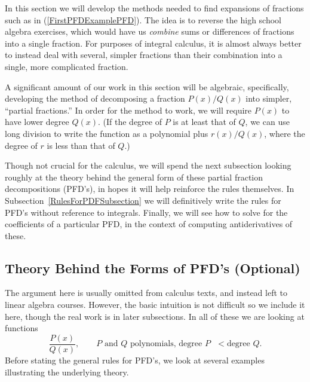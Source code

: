 In this section we will develop the methods needed to 
find expansions of fractions such as 
in (\ref{FirstPFDExamplePFD}). The idea is to reverse
the high school
algebra exercises, which would have us {\it combine} 
sums or differences of fractions into a single fraction.  For 
purposes of integral calculus, it is almost always
better to instead deal with several, simpler fractions than
their combination into a single, more complicated fraction.

A significant amount of our work in this section will be
algebraic, specifically, developing the method of decomposing
a fraction $P(x)/Q(x)$ into simpler, ``partial fractions.''
In order for the method to work, we will require $P(x)$ to
have lower degree $Q(x)$. (If the degree of $P$ is at least
that of $Q$, we can use long division to write the function
as a polynomial plus $r(x)/Q(x)$, where the degree of $r$ is
less than that of $Q$.)


Though not crucial for the calculus, we will spend the next subsection 
looking roughly at the theory behind the general
form of these partial
fraction decompositions (PFD's), in hopes it will help
reinforce the rules themselves.  
In Subsection~\ref{RulesForPDFSubsection} we will 
definitively write the
rules for PFD's without reference to integrals.
Finally, we will see how to solve for the coefficients 
of a particular PFD, in the context of computing antiderivatives
of these.

\subsection{Theory Behind the Forms of PFD's (Optional)}
The argument here is usually omitted from calculus texts,
and instead left to linear algebra courses.  However, the basic intuition 
is not difficult so we include it here, though the real work
is in later subsections.  In all of these we
are looking at functions
\begin{equation}
\frac{P(x)}{Q(x)},\qquad \text{$P$ and $Q$ polynomials, degree $P$ $<$
                                 degree $Q$}.
\label{DegP<DegQ}\end{equation}
Before stating the general rules for PFD's, we look at several examples
illustrating the underlying theory.

